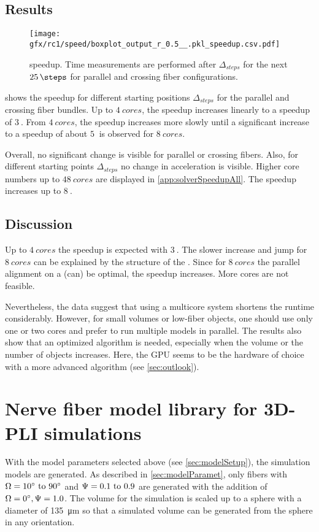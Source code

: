 \subsection{Results}
% 
\begin{figure}[!t]
\centering
\texttt{[image: gfx/rc1/speed/boxplot\_output\_r\_0.5\_\_.pkl\_speedup.csv.pdf]}
\caption{ speedup. Time measurements are performed after $\Delta_{\mathit{steps}}$ for the next $\SI{25}{\steps}$ for parallel \pfbs{} and crossing \cfbs{} fiber configurations.}
\label{fig:solverSpeedup}
\end{figure}
% 
 shows the speedup for different starting positions $\Delta_{\mathit{steps}}$ for the parallel \pfbs{} and crossing \cfbs{} fiber bundles.
Up to $\SI{4}{cores}$, the speedup increases linearly to a speedup of $\SI{3}{}$.
From $\SI{4}{cores}$, the speedup increases more slowly until a significant increase to a speedup of about $\SI{5}{}$ is observed for $\SI{8}{cores}$.
\par
% 
Overall, no significant change is visible for parallel or crossing fibers.
Also, for different starting points $\Delta_{\mathit{steps}}$ no change in acceleration is visible.
Higher core numbers up to $\SI{48}{cores}$ are displayed in \cref{app:solverSpeedupAll}.
The speedup increases up to $\SI{8}{}$.
% 
% 
% 
\subsection{Discussion}
% 
Up to $\SI{4}{cores}$ the speedup is expected with $\SI{3}{}$.
The slower increase and jump for $\SI{8}{cores}$ can be explained by the structure of the .
Since for $\SI{8}{cores}$ the parallel alignment on a  (can) be optimal, the speedup increases.
More cores are not feasible.
\par
% 
Nevertheless, the data suggest that using a multicore system shortens the runtime considerably.
However, for small volumes or low-fiber objects, one should use only one or two cores and prefer to run multiple models in parallel.
The results also show that an optimized algorithm is needed, especially when the volume or the number of objects increases.
Here, the \ac{GPU} seems to be the hardware of choice with a more advanced algorithm \cite{Karras2012} (see \cref{sec:outlook}).
% 
%
%
\section{Nerve fiber model library for \acs{3D-PLI} simulations}
%
With the model parameters selected above (see \cref{sec:modelSetup}), the simulation models are generated.
As described in \cref{sec:modelParamet}, only fibers with $\modelOmega = \SIrange{10}{90}{\degree}$ and $\modelPsi = \SIrange{0.1}{0.9}{}$ are generated with the addition of $\textnormal{$\Omega$}=\SI{0}{\degree}, \textnormal{$\Psi$}=\SI{1.0}{}$.
The volume for the simulation is scaled up to a sphere with a diameter of \SI{135}{\micro\meter} so that a simulated volume can be generated from the sphere in any orientation.
% 
%
%
